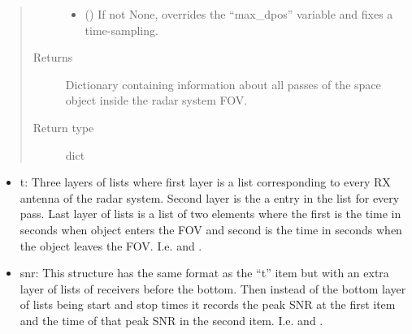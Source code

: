 \documentclass[letterpaper,10pt,english]{sphinxmanual}
\begin{document}
\begin{fulllineitems}
\begin{quote}
\begin{description}
\begin{itemize}
\item {} 
 () \textendash{} If not None, overrides the “max\_dpos” variable and fixes a time-sampling.

\end{itemize}

\item[{Returns}] \leavevmode
Dictionary containing information about all passes of the space object inside the radar system FOV.

\item[{Return type}] \leavevmode
dict

\end{description}\end{quote}

\begin{itemize}
\item {} 
t: Three layers of lists where first layer is a list corresponding to every RX antenna of the radar system. Second layer is the a entry in the list for every pass. Last layer of lists is a list of two elements where the first is the time in seconds when object enters the FOV and second is the time in seconds when the object leaves the FOV. I.e.  and .

\item {} 
snr: This structure has the same format as the “t” item but with an extra layer of lists of receivers before the bottom. Then instead of the bottom layer of lists being start and stop times it records the peak SNR at the first item and the time of that peak SNR in the second item. I.e.  and .

\end{itemize}

\end{fulllineitems}

\end{document}

